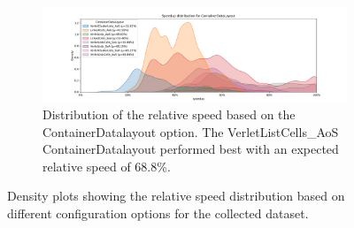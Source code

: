 \begin{figure}[H]
  \begin{subfigure}{\columnwidth}
    \centering
    \includegraphics[width=\columnwidth,trim={1cm 0 2cm 1.5cm},clip]{figures/DataAnalytics/speedup_ContainerDataLayout.png}
    \caption[Speedup density plot of Configuration-Datalayout option]{Distribution of the relative speed based on the ContainerDatalayout option. The VerletListCells\_AoS ContainerDatalayout performed best with an expected relative speed of 68.8\%.}
    \label{fig:inputAnalysisDensityDatalayout}
  \end{subfigure}

  \caption[Speedup density plots based on different configuration options]{Density plots showing the relative speed distribution based on different configuration options for the collected dataset.}
  \label{fig:inputAnalysisDensity}
\end{figure}
